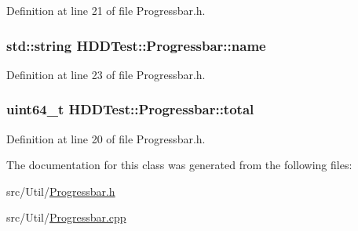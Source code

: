 Definition at line 21 of file Progressbar.\-h.

\hypertarget{class_h_d_d_test_1_1_progressbar_a07e67985ad3a30bee17d36014a56b328}{
\subsubsection[{name}]{\setlength{\rightskip}{0pt plus 5cm}std\-::string H\-D\-D\-Test\-::\-Progressbar\-::name}}\label{class_h_d_d_test_1_1_progressbar_a07e67985ad3a30bee17d36014a56b328}


Definition at line 23 of file Progressbar.\-h.

\hypertarget{class_h_d_d_test_1_1_progressbar_a611fb784d62df0f9f2d56ad90e15c47c}{
\subsubsection[{total}]{\setlength{\rightskip}{0pt plus 5cm}uint64\-\_\-t H\-D\-D\-Test\-::\-Progressbar\-::total}}\label{class_h_d_d_test_1_1_progressbar_a611fb784d62df0f9f2d56ad90e15c47c}


Definition at line 20 of file Progressbar.\-h.



The documentation for this class was generated from the following files\-:\begin{DoxyCompactItemize}
\item 
src/\-Util/\hyperlink{_progressbar_8h}{Progressbar.\-h}\item 
src/\-Util/\hyperlink{_progressbar_8cpp}{Progressbar.\-cpp}\end{DoxyCompactItemize}
